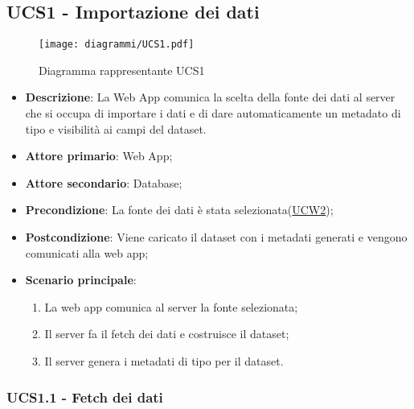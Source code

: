 \subsection{UCS1 - Importazione dei dati}
\label{sub:ucs1}


\begin{figure}[h]
	\centering
	\texttt{[image: diagrammi/UCS1.pdf]}
	\caption{Diagramma rappresentante UCS1}
	\label{fig:UCS1}
\end{figure}

\begin{itemize}
	\item \textbf{Descrizione}: La Web App comunica la scelta della fonte dei dati al server che si occupa di importare i dati e di dare automaticamente un metadato di tipo e visibilità ai campi del dataset.

	\item \textbf{Attore primario}: Web App;
	\item \textbf{Attore secondario}: Database;

	\item \textbf{Precondizione}:   La fonte dei dati è stata selezionata(\hyperref[ssub:ucw2]{UCW2});

	\item \textbf{Postcondizione}:  Viene caricato il dataset con i metadati generati e vengono comunicati alla web app;

	\item \textbf{Scenario principale}:
	      \begin{enumerate}
		      \item La web app comunica al server la fonte selezionata;
		      \item Il server fa il fetch dei dati e costruisce il dataset;
		      \item Il server genera i metadati di tipo per il dataset.
	      \end{enumerate}

\end{itemize}

\subsubsection{UCS1.1 - Fetch dei dati}
\label{ssub:ucs1.1}

